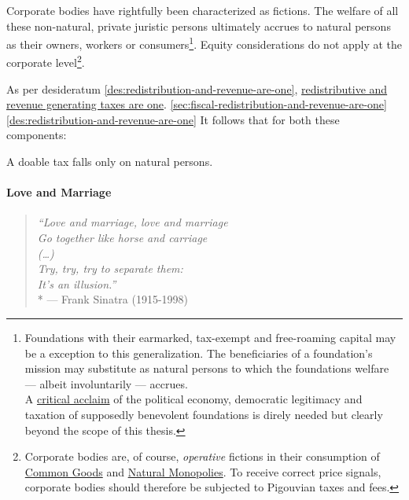 
Corporate bodies have rightfully been characterized as fictions.
 The welfare of all these non-natural, private juristic persons ultimately accrues to natural persons as their owners, workers or consumers\footnote{
	Foundations with their earmarked, tax-exempt and free-roaming capital may be a exception to this generalization.
The beneficiaries of a foundation's mission may substitute as natural persons to which the foundations welfare --- albeit involuntarily --- accrues.\\A \href{http://maxheld.de/2010/03/27/foundations-may-be-bad/}{critical acclaim} of the political economy, democratic legitimacy and taxation of supposedly benevolent foundations is direly needed but clearly beyond the scope of this thesis.}.
Equity considerations do not apply at the corporate level\footnote{
	Corporate bodies are, of course, \emph{operative} fictions in their consumption of \href{sec:common-good}{Common Goods} and \href{sec:natural-monopoly}{Natural Monopolies}.
To receive correct price signals, corporate bodies should therefore be subjected to Pigouvian taxes and fees.}.

As per desideratum \ref{des:redistribution-and-revenue-are-one}, \hyperref[des:redistribution-and-revenue-are-one]{redistributive and revenue generating taxes are one}. \ref{sec:fiscal-redistribution-and-revenue-are-one} \ref{des:redistribution-and-revenue-are-one}
It follows that for both these components:

\begin{desideratum}
	A doable tax falls only on natural persons.
	\label{des:personal-taxation}
\end{desideratum}

\paragraph{Love and Marriage}
	\label{sec:love-marriage}

\begin{verse}
	\emph{``Love and marriage, love and marriage\\
	Go together like horse and carriage\\
	(\ldots)\\
	Try, try, try to separate them:\\
	It's an illusion.''}\\*
	--- Frank Sinatra (1915-1998)
\end{verse}

